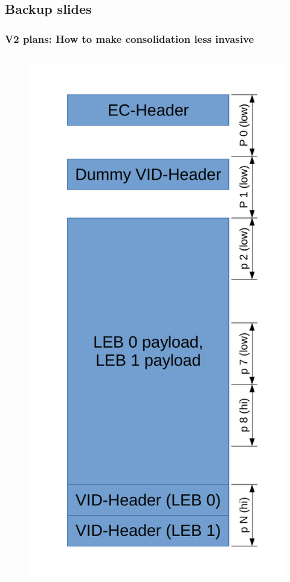 \documentclass[aspectratio=169,obeyspaces,spaces,hyphens,dvipsnames]{beamer}
\begin{document}
\subsection{Backup slides}

\begin{frame}[fragile]
\frametitle{V2 plans: How to make consolidation less invasive}
   \begin{columns}
     \begin{figure}
     \includegraphics[scale=0.33]{ubi_mlc_conso_dummy.pdf}

\end{figure}
\end{columns}
\end{frame}
\end{document}
